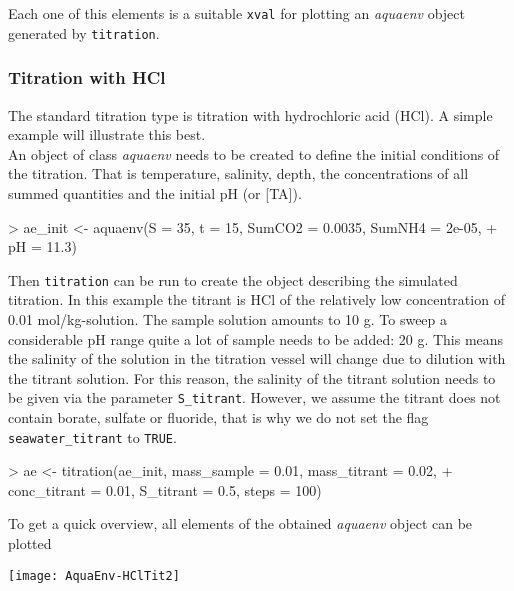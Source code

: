 \documentclass[article,nojss]{jss}
\begin{document}
\noindent
Each one of this elements is a suitable \texttt{xval} for plotting an \textit{aquaenv} object generated by \texttt{titration}.

\subsubsection{Titration with HCl}
The standard titration type is titration with hydrochloric acid (HCl). A simple example will illustrate this best.\\

\noindent
An object of class \textit{aquaenv} needs to be created to define the initial conditions of the titration. That is
temperature, salinity, depth, the concentrations of all summed quantities and the initial pH (or [TA]).

\begin{Schunk}
\begin{Sinput}
> ae_init <- aquaenv(S = 35, t = 15, SumCO2 = 0.0035, SumNH4 = 2e-05, 
+     pH = 11.3)
\end{Sinput}
\end{Schunk}

Then \texttt{titration} can be run to create the object describing the simulated titration.
In this example the titrant is HCl of the relatively low concentration of 0.01 mol/kg-solution.
The sample solution amounts to 10 g. To sweep a considerable pH range quite a lot of sample needs to be 
added: 20 g. This means the salinity of the solution in the titration vessel will change due to dilution with the titrant solution.
For this reason, the salinity of the titrant solution needs to be given via the parameter \texttt{S\_titrant}.
However, we assume the titrant does not contain borate, sulfate or fluoride, that is why we do not set the 
flag \texttt{seawater\_titrant} to \texttt{TRUE}.

\begin{Schunk}
\begin{Sinput}
> ae <- titration(ae_init, mass_sample = 0.01, mass_titrant = 0.02, 
+     conc_titrant = 0.01, S_titrant = 0.5, steps = 100)
\end{Sinput}
\end{Schunk}

To get a quick overview, all elements of the obtained \textit{aquaenv} object can be plotted

\begin{Schunk}
\end{Schunk}
\texttt{[image: AquaEnv-HClTit2]}
\end{document}
